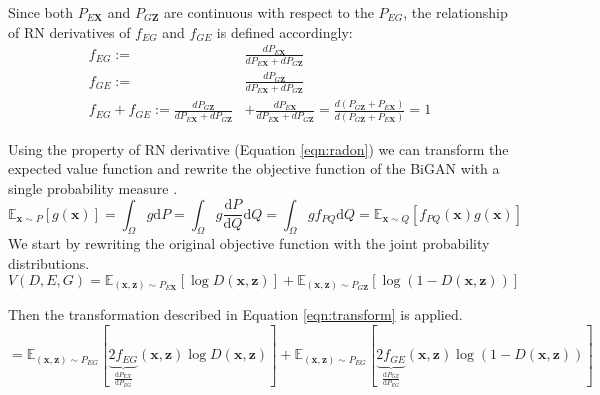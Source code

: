 Since both $P_{E\mathbf{X}}$ and $P_{G\mathbf{Z}}$ are continuous with respect to the $P_{EG}$, the
relationship of RN derivatives of $f_{EG}$ and $f_{GE}$ is defined accordingly:
\begin{align}
  f_{EG} :=& \frac{ d P_{E\mathbf{X}} }{ d P_{E\mathbf{X}} + d P_{G\mathbf{Z}}} \\[5pt]
  f_{GE} :=& \frac{ d P_{G\mathbf{Z}} }{ d P_{E\mathbf{X}} + d P_{G\mathbf{Z}}} \\[5pt]
  f_{EG} + f_{GE} :=   \frac{ d P_{G\mathbf{Z}} }{ d P_{E\mathbf{X}} + d P_{G\mathbf{Z}}} &+ \frac{ d P_{E\mathbf{X}} }{ d P_{E\mathbf{X}} + d P_{G\mathbf{Z}}} = \frac{ d( P_{G\mathbf{Z}} + P_{E\mathbf{X}}) }{ d( P_{G\mathbf{Z}} + P_{E\mathbf{X}} ) } = 1 
\end{align}

Using the property of RN derivative (Equation \ref{eqn:radon}) we can transform the expected value
function and rewrite the objective function of the BiGAN with a single probability
measure \cite{Donahue2017AdversarialFL} \cite{Goodfellow:2014:GAN:2969033.2969125}.
\begin{equation}
    \label{eqn:transform}
    \mathbb{E}_{\mathbf{x} \sim P}[g(\mathbf{x})]=\int_{\Omega} g \mathrm{d} P=\int_{\Omega} g \frac{\mathrm{d} P}{\mathrm{d} Q} \mathrm{d} Q=\int_{\Omega} g f_{P Q} \mathrm{d} Q=\mathbb{E}_{\mathbf{x} \sim Q}\left[f_{P Q}(\mathbf{x}) g(\mathbf{x})\right]
\end{equation}
We start by rewriting the original objective function with the joint probability distributions.
\begin{equation}
    V(D, E, G) = \mathbb{E}_{(\mathbf{x}, \mathbf{z}) \sim P_{E \mathbf{X}}}[\log D(\mathbf{x}, \mathbf{z})]+\mathbb{E}_{(\mathbf{x}, \mathbf{z}) \sim P_{G \mathbf{Z}}}[\log (1-D(\mathbf{x}, \mathbf{z}))] 
\end{equation}

Then the transformation described in Equation \ref{eqn:transform} is applied.
\begin{equation}
    =\mathbb{E}_{(\mathbf{x}, \mathbf{z}) \sim P_{E G}}  [ \underbrace{2 f_{E G}}_{\frac{\mathrm{d} P_{E X}}{\mathrm{d} P_{E G}}}(\mathbf{x}, \mathbf{z}) \log D(\mathbf{x}, \mathbf{z})] +\mathbb{E}_{(\mathbf{x}, \mathbf{z}) \sim P_{E G}}[\underbrace{2 f_{G E}}_{\frac{\mathrm{d} P_{G Z}}{\mathrm{d} P_{E G}}}(\mathbf{x}, \mathbf{z}) \log (1-D(\mathbf{x}, \mathbf{z}))]
\end{equation}


